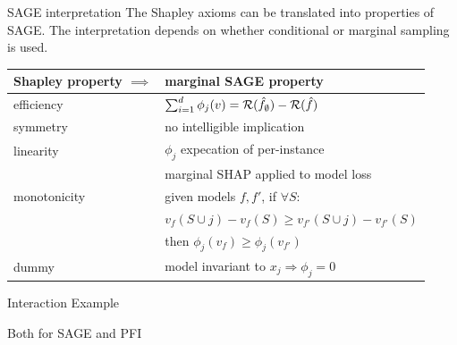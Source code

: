 \documentclass[11pt,compress,t,notes=noshow, xcolor=table]{beamer}
\begin{document}
\begin{vbframe}{SAGE interpretation}
%
The Shapley axioms can be translated into properties of SAGE. The interpretation depends on whether conditional or marginal sampling is used.
%
\begin{table}
  \centering
  \begin{tabular}{l | l }
  Shapley property $\implies$ & marginal SAGE property \\
  \hline
  efficiency & $\sum_{i=1}^d \phi_j(v) = \risk(\fh_\emptyset) - \risk(\fh)$\\
  symmetry & no intelligible implication \\
  linearity & $\phi_j$ expecation of per-instance\\
  & marginal SHAP applied to model loss\\
  monotonicity & given models $f, f'$, if  $\forall S:$\\
  &$v_f(S \cup j) - v_f(S) \geq v_{f'}(S \cup j) - v_{f'}(S)$ \\
  &then $\phi_j(v_f) \geq \phi_j(v_{f'})$\\
  dummy & model invariant to $x_j \Rightarrow \phi_j = 0$\\
  \end{tabular}
\end{table}
%
\end{vbframe}

\begin{vbframe}{Interaction Example}
  
  Both for SAGE and PFI
  
\end{vbframe}
\end{document}

